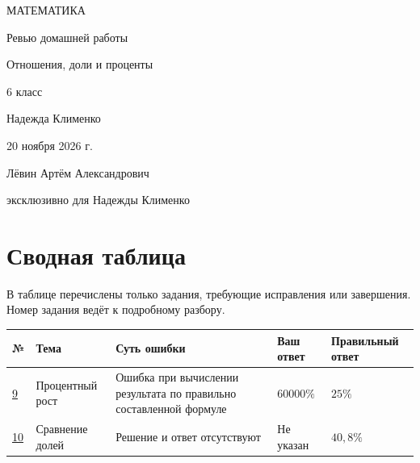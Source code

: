\documentclass[a4paper,12pt]{article}
\begin{document}
\thispagestyle{empty}
\begin{center}
\vspace*{22mm}
{\large\color{darkaccent}МАТЕМАТИКА}\par
\vspace{23mm}
{\LARGE Ревью домашней работы}\par
\vspace{10mm}
{\Large\color{accent}Отношения, доли и проценты}\par
\vspace{9mm}
{\normalsize 6 класс}\par
\vfill
{\large Надежда Клименко}\par
\vspace{13mm}
{\normalsize 20 ноября 2026 г.}\par
\vspace{18mm}
{\small Лёвин Артём Александрович}\par
{\small эксклюзивно для Надежды Клименко}\par
\vspace{20mm}
\vspace*{6mm}
\end{center}
\clearpage

\section*{Сводная таблица}
\noindent\textcolor{bodygray}{В таблице перечислены только задания, требующие исправления или завершения. Номер задания ведёт к подробному разбору.}

\begingroup
\small\setlength{\tabcolsep}{4pt}
\begin{tabularx}{\linewidth}{@{}p{13mm}p{25mm}X p{22mm}p{29mm}@{}}
\toprule
\textbf{№} & \textbf{Тема} & \textbf{Суть ошибки} & \textbf{Ваш ответ} & \textbf{Правильный ответ} \\
\midrule
\hyperref[task:9]{9} & Процентный рост & Ошибка при вычислении результата по правильно составленной формуле & $60000\%$ & $25\%$ \\
\addlinespace[3pt]
\hyperref[task:10]{10} & Сравнение долей & Решение и ответ отсутствуют & Не указан & $40{,}8\%$ \\
\bottomrule
\end{tabularx}
\endgroup
\end{document}
